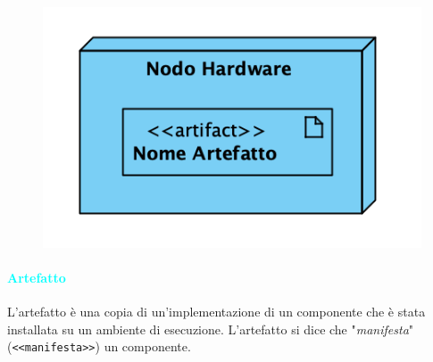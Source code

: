 \begin{figure}[H]
    \centering
    \includegraphics[scale=0.8]{img/architettura.png}
\end{figure}

\paragraph{\textcolor{cyan}{Artefatto}} L'artefatto è una copia di un'implementazione di un componente
che è stata installata su un ambiente di esecuzione. L'artefatto si dice che "\emph{manifesta}" (\verb|<<manifesta>>|) un componente.